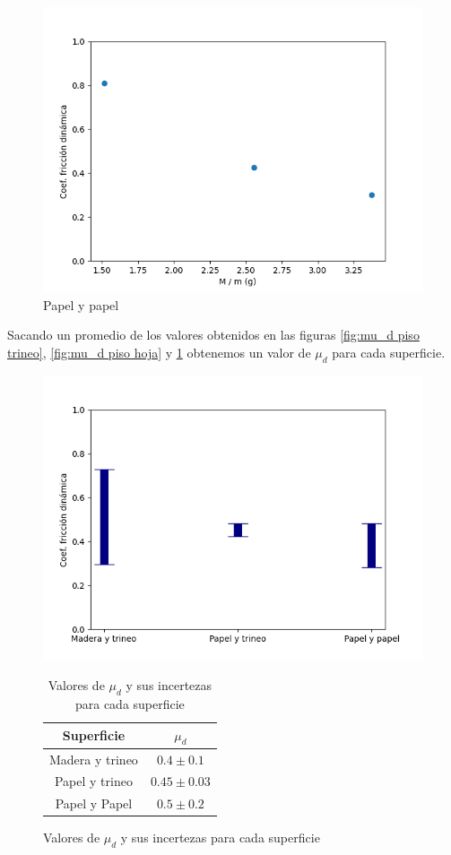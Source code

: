 \documentclass[12pt,a4]{article}
\begin{document}
\begin{figure}[H]
    \centering
    \includegraphics[width=0.6\linewidth]{ud_PapelPapel.png}
    \caption{Papel y papel}
    \label{fig:mu_d papel papel}
\end{figure}

Sacando un promedio de los valores obtenidos en las figuras \ref{fig:mu_d piso trineo}, \ref{fig:mu_d piso hoja} y \ref{fig:mu_d papel papel} obtenemos un valor de $\mu_d$ para cada superficie.

\begin{figure}[H]
    \begin{minipage}{0.5\textwidth}
        \centering
        \includegraphics[width=0.9\linewidth]{ud_Combined.png}
        \caption{Promedio de $\mu_d$ para cada superficie}
        \label{fig:mu_d promedio}
    \end{minipage}\hfill
    \begin{minipage}{0.5\textwidth}
        \centering
        \begin{table}[H]
            \centering
            \begin{tabular}{|c|c|}
                \hline
                \textbf{Superficie} & \textbf{$\mu_d$}\\
                \hline
                Madera y trineo & $0.4 \pm 0.1$\\
                Papel y trineo & $0.45 \pm 0.03$ \\
                Papel y Papel & $0.5 \pm 0.2$ \\
                \hline
            \end{tabular}
            \caption{Valores de $\mu_d$ y sus incertezas para cada superficie}
            \label{tab:mu_d}
        \end{table}
    \end{minipage}
\end{figure}
\end{document}
